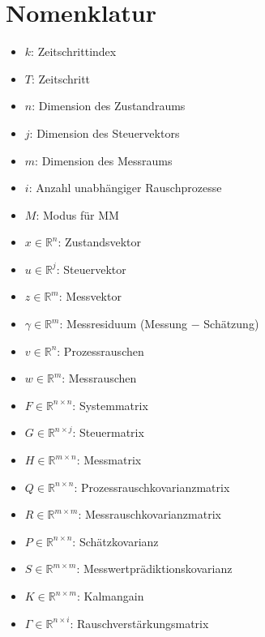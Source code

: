 \chapter{Nomenklatur}
\begin{itemize}
    \item $k$: Zeitschrittindex
    \item $T$: Zeitschritt
    \item $n$: Dimension des Zustandraums
    \item $j$: Dimension des Steuervektors
    \item $m$: Dimension des Messraums
    \item $i$: Anzahl unabhängiger Rauschprozesse
    \item $M$: Modus für MM
    \item $x \in \mathbb{R}^n$: Zustandsvektor
    \item $u \in \mathbb{R}^j$: Steuervektor
    \item $z \in \mathbb{R}^m$: Messvektor
    \item $\gamma \in \mathbb{R}^m$: Messresiduum (Messung $-$ Schätzung)
    \item $v \in \mathbb{R}^n$: Prozessrauschen
    \item $w \in \mathbb{R}^m$: Messrauschen
    \item $F \in \mathbb{R}^{n \times n}$: Systemmatrix
    \item $G \in \mathbb{R}^{n \times j}$: Steuermatrix
    \item $H \in \mathbb{R}^{m \times n}$: Messmatrix
    \item $Q \in \mathbb{R}^{n \times n}$: Prozessrauschkovarianzmatrix
    \item $R \in \mathbb{R}^{m \times m}$: Messrauschkovarianzmatrix
    \item $P \in \mathbb{R}^{n \times n}$: Schätzkovarianz
    \item $S \in \mathbb{R}^{m \times m}$: Messwertprädiktionskovarianz
    \item $K \in \mathbb{R}^{n \times m}$: Kalmangain
    \item $\Gamma \in \mathbb{R}^{n \times i}$: Rauschverstärkungsmatrix
\end{itemize}
